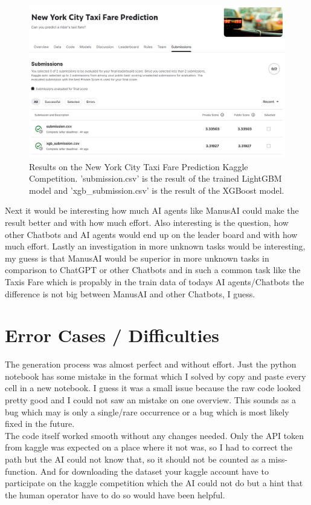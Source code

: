 \documentclass[fontsize=11pt, paper=a4, pagesize=auto]{scrreprt}
\begin{document}
	\begin{figure}[H]
		\centering
		\includegraphics[width=\textwidth]{img/results.png}
		\caption[Results on the New York City Taxi Fare Prediction Kaggle Competition. 'submission.csv' is the result of the trained LightGBM model and 'xgb\_submission.csv' is the result of the XGBoost model.]{Results on the New York City Taxi Fare Prediction Kaggle Competition. 'submission.csv' is the result of the trained LightGBM model and 'xgb\_submission.csv' is the result of the XGBoost model.}
		\label{fig:results}
	\end{figure}
	\FloatBarrier
	
	Next it would be interesting how much AI agents like ManusAI could make the result better and with how much effort.
	Also interesting is the question, how other Chatbots and AI agents would end up on the leader board and with how much effort. Lastly an investigation in more unknown tasks would be interesting, my guess is that ManusAI would be superior in more unknown tasks in comparison to ChatGPT or other Chatbots and in such a common task like the Taxis Fare which is propably in the train data of todays AI agents/Chatbots the difference is not big between ManusAI and other Chatbots, I guess.
	
	
	
\chapter{Error Cases / Difficulties}
\label{cha:error}
	The generation process was almost perfect and without effort. Just the python notebook has some mistake in the format which I solved by copy and paste every cell in a new notebook. I guess it was a small issue because the raw code looked pretty good and I could not saw an mistake on one overview. This sounds as a bug which may is only a single/rare occurrence or a bug which is most likely fixed in the future.\\
	The code itself worked smooth without any changes needed. Only the API token from kaggle was expected on a place where it not was, so I had to correct the path but the AI could not know that, so it should not be counted as a miss-function. And for downloading the dataset your kaggle account have to participate on the kaggle competition which the AI could not do but a hint that the human operator have to do so would have been helpful.
	
\end{document}
